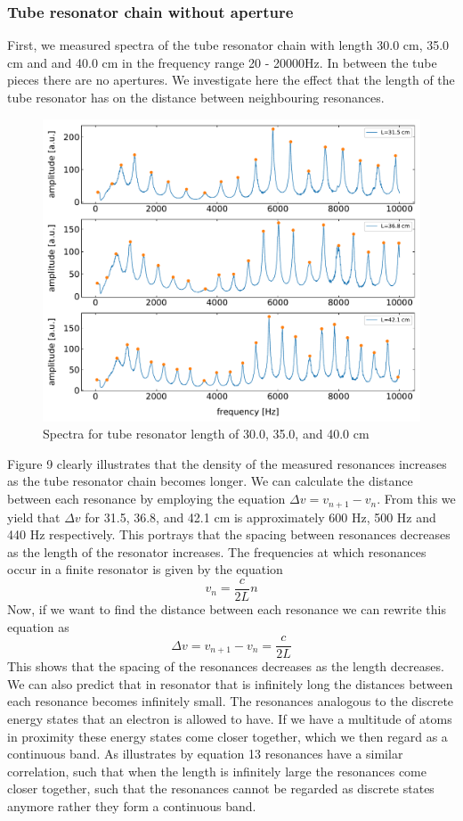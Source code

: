 \documentclass[12pt]{article}
\begin{document}
\subsubsection{Tube resonator chain without aperture}
First, we measured spectra of the tube resonator chain with length 30.0 cm, 35.0 cm and and 40.0 cm in the frequency range 20 - 20000Hz. In between the tube pieces there are no apertures. We investigate here the effect that the length of the tube resonator has on the distance between neighbouring resonances.
\begin{figure}[hbt]
	\caption{Spectra for tube resonator length of 30.0, 35.0, and 40.0 cm }
	\includegraphics[width=.7\textwidth]{results/resonances_wo_aperture}	
\end{figure}
Figure 9 clearly illustrates that the density of the measured resonances increases as the tube resonator chain becomes longer. We can calculate the distance between each resonance by employing the equation $\Delta v = v_{n+1} - v_n$. From this we yield that $\Delta v$ for 31.5, 36.8, and 42.1 cm is approximately 600 Hz, 500 Hz and 440 Hz respectively. This portrays that the spacing between resonances decreases as the length of the resonator increases. The frequencies at which resonances occur in a finite resonator is given by the equation
\begin{equation}
	v_n = \frac{c}{2L}n
\end{equation}
Now, if we want to find the distance between each resonance we can rewrite this equation as
\begin{equation}
	\Delta v = v_{n+1} - v_n = \frac{c}{2L}
\end{equation}
This shows that the spacing of the resonances decreases as the length decreases. We can also predict that in resonator that is infinitely long the distances between each resonance becomes infinitely small. The resonances analogous to the discrete energy states that an electron is allowed to have. If we have a multitude of atoms in proximity these energy states come closer together, which we then regard as a continuous band. As illustrates by equation 13 resonances have a similar correlation, such that when the length is infinitely large the resonances come closer together, such that the resonances cannot be regarded as discrete states anymore rather they form a continuous band.
\end{document}
